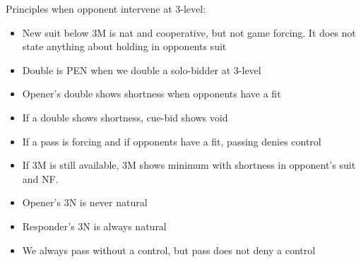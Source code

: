 \documentclass{article}
\renewcommand{\sp}{\ensuremath\spadesuit}
\newcommand{\he}{\ensuremath\heartsuit}
\newcommand{\di}{\ensuremath\diamondsuit}
\newcommand{\nt}{\relsize{-1}NT\relsize{1}}
\begin{document}
Principles when opponent intervene at 3-level:
\begin{itemize}
	\itemsep0em
	\item New suit below 3M is nat and cooperative, but not game forcing. It does not state anything about holding in opponents suit
	\item Double is PEN when we double a solo-bidder at 3-level
	\item Opener's double shows shortness when opponents have a fit
	\item If a double shows shortness, cue-bid shows void
	\item If a pass is forcing and if opponents have a fit, passing denies control
	\item If 3M is still available, 3M shows minimum with shortness in opponent's suit and NF.
	\item Opener's 3N is never natural
	\item Responder's 3N is always natural
	\item We always pass without a control, but pass does not deny a control
\end{itemize}


\medskip

\end{document}
